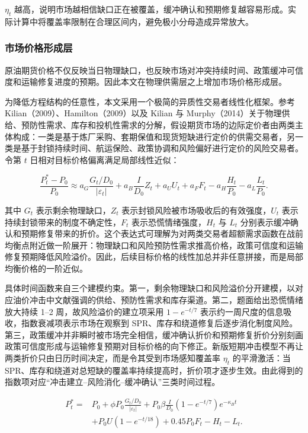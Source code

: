 $\eta_t$ 越高，说明市场越相信缺口正在被覆盖，缓冲确认和预期修复越容易形成。实际计算中将覆盖率限制在合理区间内，避免极小分母造成异常放大。

\subsubsection{市场价格形成层}

原油期货价格不仅反映当日物理缺口，也反映市场对冲突持续时间、政策缓冲可信度和运输修复进度的预期。因此本文在物理供需层之上增加市场价格形成层。

为降低方程结构的任意性，本文采用一个极简的异质性交易者线性化框架。参考 Kilian（2009）、Hamilton（2009）以及 Kilian 与 Murphy（2014）关于物理供给、预防性需求、库存和投机性需求的分解，假设期货市场的边际定价者由两类主体构成：一类是基于炼厂采购、套期保值和现货短缺进行定价的供需交易者，另一类是基于封锁持续时间、航运保险、政策协调和风险偏好进行定价的风险交易者。令第 \(t\) 日相对目标价格偏离满足局部线性近似：

\begin{equation}
  \frac{P_t^\ast-P_0}{P_0}
  \approx
  a_G\frac{G_t/D_0}{|\varepsilon_t|}
  +a_B\frac{I}{D_0}Z_t
  +a_U U_t
  +a_F F_t
  -a_H\frac{H_t}{P_0}
  -a_L\frac{L_t}{P_0}.
\end{equation}

其中 \(G_t\) 表示剩余物理缺口，\(Z_t\) 表示封锁风险被市场吸收后的有效强度，\(U_t\) 表示持续封锁带来的制度不确定性，\(F_t\) 表示恐慌情绪强度，\(H_t\) 与 \(L_t\) 分别表示缓冲确认和预期修复带来的折价。这个表达式可理解为对两类交易者超额需求函数在战前均衡点附近做一阶展开：物理缺口和风险预防性需求推高价格，政策可信度和运输修复预期降低风险溢价。因此，后续目标价格的线性加总并非任意拼接，而是局部均衡价格的一阶近似。

具体时间函数来自三个建模约束。第一，剩余物理缺口和风险溢价分开建模，以对应油价冲击中文献强调的供给、预防性需求和库存渠道。第二，题面给出恐慌情绪放大持续 1--2 周，故风险溢价的建立项采用 \(1-e^{-t/7}\) 表示约一周尺度的信息吸收，指数衰减项表示市场在观察到 SPR、库存和绕道修复后逐步消化制度风险。第三，政策缓冲并非瞬时被市场完全相信，缓冲确认折价和预期修复折价分别刻画政策可信度形成与运输修复预期对目标价格的向下修正。新版短期冲击模型不再让两类折价只由日历时间决定，而是令其受到市场感知覆盖率 \(\eta_t\) 的平滑激活：当 SPR、库存和绕道对总短缺的覆盖率持续提高时，折价项才逐步生效。由此得到的指数项对应“冲击建立--风险消化--缓冲确认”三类时间过程。

\begin{equation}
\begin{aligned}
  P_t^\ast
  ={}& P_0
  + \phi P_0 \frac{G_t/D_0}{|\varepsilon_t|}
  + P_0\beta\frac{I}{D_0}
    \left(1-e^{-t/7}\right)e^{-\kappa_B t} \\
  & + P_0U\left(1-e^{-t/18}\right)
  + 0.45P_0F_t
  - H_t - L_t .
\end{aligned}
\end{equation}

